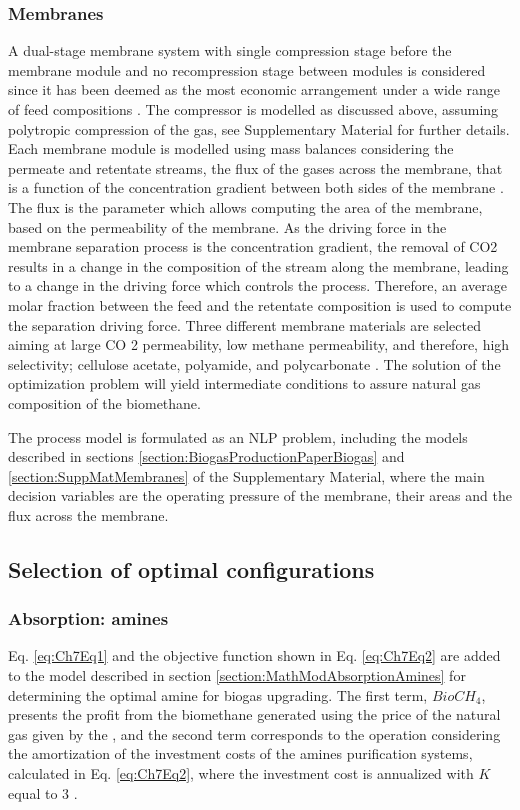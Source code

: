 \begin{refsection}[referencesCh7]
\subsubsection{Membranes} \label{section:MathModMembranes}
A dual-stage membrane system with single compression stage before the membrane module and no recompression stage between modules is considered since it has been deemed as the most economic arrangement under a wide range of feed compositions \citep{kim2017optimization}. The compressor is modelled as discussed above, assuming polytropic compression of the gas, see Supplementary Material for further details. Each membrane module is modelled using mass balances considering the permeate and retentate streams, the flux of the gases across the membrane, that is a function of the concentration gradient between both sides of the membrane \citep{FernandesRodriguesMsc}. The flux is the parameter which allows computing the area of the membrane, based on the permeability of the membrane. As the driving force in the membrane separation process is the concentration gradient, the
removal of CO2 results in a change in the composition of the stream along the membrane, leading to a change in the driving force which controls the process. Therefore, an average molar fraction between the feed and the retentate composition is used to compute the separation driving force. Three different membrane materials are selected aiming at large CO 2 permeability, low methane permeability, and therefore, high selectivity; cellulose acetate, polyamide, and polycarbonate \citep{vrbova2017upgrading}. The solution of the optimization problem will yield intermediate conditions to assure natural gas composition of the biomethane.

The process model is formulated as an NLP problem, including the models described in sections \ref{section:BiogasProductionPaperBiogas} and \ref{section:SuppMatMembranes} of the Supplementary Material, where the main decision variables are the operating pressure of the membrane, their areas and the flux across the membrane.

\subsection{Selection of optimal configurations}
\subsubsection{Absorption: amines}
Eq. \ref{eq:Ch7Eq1} and the objective function shown in Eq. \ref{eq:Ch7Eq2} are added to the model described in section \ref{section:MathModAbsorptionAmines} for determining the optimal amine for biogas upgrading. The first term, $BioCH_{4}$, presents the profit from the biomethane generated using the price of the natural gas given by the \citet{EIAPrices}, and the second term corresponds to the operation considering the amortization of the investment costs of the amines purification systems, calculated in Eq. \ref{eq:Ch7Eq2}, where the investment cost is annualized with $K$ equal to 3 \citep{douglas1988conceptual}.


\end{refsection}
